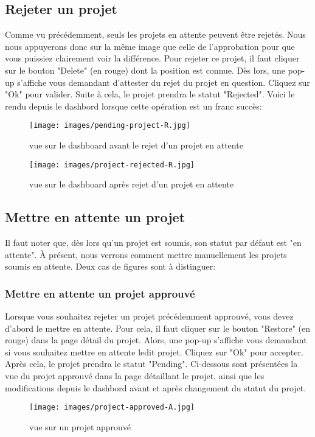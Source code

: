 \documentclass[12pt]{article}
\begin{document}
\medskip
\subsection{Rejeter un projet}
Comme vu précédemment, seuls les projets en attente peuvent être rejetés. Nous nous appuyerons donc sur la même image que celle de l'approbation pour que vous puissiez clairement voir la différence. 
Pour rejeter ce projet, il faut cliquer sur le bouton "Delete" (en rouge) dont la position est connue. Dès lors, une pop-up s'affiche vous demandant d'attester du rejet du projet en question. Cliquez sur "Ok" pour valider. Suite à cela, le projet prendra le statut "Rejected". Voici le rendu depuis le dashbord lorsque cette opération est un franc succès: 
    \begin{figure}[h!]
        \centering
        \texttt{[image: images/pending-project-R.jpg]}
        \caption{vue sur le dashboard avant le rejet d'un projet en attente}
        \label{dashboard avant le rejet d'un projet en attente}
    \end{figure}

\medskip

    \begin{figure}[h!]
        \centering
        \texttt{[image: images/project-rejected-R.jpg]}
        \caption{vue sur le dashboard après rejet d'un projet en attente}
        \label{dashboard après rejet d'un projet en attente}
    \end{figure}

\medskip
\subsection{Mettre en attente un projet}
Il faut noter que, dès lors qu'un projet est soumis, son statut par défaut est "en attente". À présent, nous verrons comment mettre manuellement les projets soumis en attente. Deux cas de figures sont à distinguer:

\subsubsection{Mettre en attente un projet approuvé}
Lorsque vous souhaitez rejeter un projet précédemment approuvé, vous devez d'abord le mettre en attente. Pour cela, il faut cliquer sur le bouton "Restore" (en rouge) dans la page détail du projet. Alors, une pop-up s'affiche vous demandant si vous souhaitez mettre en attente ledit projet. Cliquez sur "Ok" pour accepter. Après cela, le projet prendra le statut "Pending". Ci-dessous sont présentées la vue du projet approuvé dans la page détaillant le projet, ainsi que les modifications depuis le dashbord avant et après changement du statut du projet. 
        \begin{figure}[h!]
            \centering
            \texttt{[image: images/project-approved-A.jpg]}
            \caption{vue sur un projet approuvé}
            \label{vue sur un projet approuvé}
        \end{figure}
\end{document}
